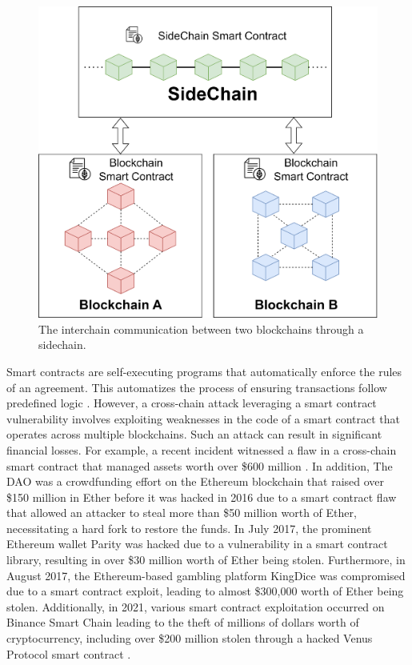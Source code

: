 \documentclass[sigconf]{acmart}
\begin{document}
\begin{figure}[hbt]
  \centering
  \includegraphics[width=0.9\linewidth]{SideChainMain.png}
  \caption{The interchain communication between two blockchains through a sidechain.}
\end{figure}

Smart contracts are self-executing programs that automatically enforce the rules of an agreement. This automatizes the process of ensuring transactions follow predefined logic \cite{miraz2019atomic}. However, a cross-chain attack leveraging a smart contract vulnerability involves exploiting weaknesses in the code of a smart contract that operates across multiple blockchains. Such an attack can result in significant financial losses. For example, a recent incident witnessed a flaw in a cross-chain smart contract that managed assets worth over \$600 million \cite{zhang2022xscope}. In addition, The DAO was a crowdfunding effort on the Ethereum blockchain that raised over \$150 million in Ether before it was hacked in 2016 due to a smart contract flaw that allowed an attacker to steal more than \$50 million worth of Ether, necessitating a hard fork to restore the funds. In July 2017, the prominent Ethereum wallet Parity was hacked due to a vulnerability in a smart contract library, resulting in over \$30 million worth of Ether being stolen. Furthermore, in August 2017, the Ethereum-based gambling platform KingDice was compromised due to a smart contract exploit, leading to almost \$300,000 worth of Ether being stolen. Additionally, in 2021, various smart contract exploitation occurred on Binance Smart Chain leading to the theft of millions of dollars worth of cryptocurrency, including over \$200 million stolen through a hacked Venus Protocol smart contract \cite{sayeed2020smart, atzei2017survey}.
\end{document}

